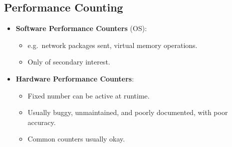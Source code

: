\documentclass[11pt]{article}
\begin{document}
\subsection{Performance Counting}
\begin{itemize}
  \item \textbf{Software Performance Counters} (OS):
    \begin{itemize}
      \item e.g.\ network packages sent, virtual memory operations.
      \item Only of secondary interest.
    \end{itemize}
  \item \textbf{Hardware Performance Counters}:
    \begin{itemize}
      \item Fixed number can be active at runtime.
      \item Usually buggy, unmaintained, and poorly documented, with poor accuracy.
      \item Common counters usually okay.
    \end{itemize}
\end{itemize}
\end{document}
